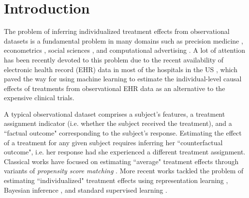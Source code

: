 \documentclass{article}
\begin{document}
\begin{abstract} 
We propose a novel approach for inferring the individualized causal effects of a treatment (intervention) from observational data. Our approach conceptualizes causal inference as a {\it multitask} learning problem; we model a subject's potential outcomes using a deep multitask network with a set of shared layers among the factual and counterfactual outcomes, and a set of outcome-specific layers. The impact of selection bias in the observational data is alleviated via a {\it propensity-dropout} regularization scheme, in which the network is thinned for every training example via a dropout probability that depends on the associated propensity score. The network is trained in alternating phases, where in each phase we use the training examples of one of the two potential outcomes (treated and control populations) to update the weights of the shared layers and the respective outcome-specific layers. Experiments conducted on data based on a real-world observational study show that our algorithm outperforms the state-of-the-art.       
\end{abstract} 

\section{Introduction} 
\label{intro}
The problem of inferring individualized treatment effects from observational datasets is a fundamental problem in many domains such as precision medicine \cite{shalit2016estimating}, econometrics \cite{abadie2016matching}, social sciences \cite{athey2016recursive}, and computational advertising \cite{bottou2013counterfactual}. A lot of attention has been recently devoted to this problem due to the recent availability of electronic health record (EHR) data in most of the hospitals in the US \cite{charles2015electronic}, which paved the way for using machine learning to estimate the individual-level causal effects of treatments from observational EHR data as an alternative to the expensive clinical trials. 

A typical observational dataset comprises a subject's features, a treatment assignment indicator (i.e. whether the subject received the treatment), and a ``factual outcome" corresponding to the subject's response. Estimating the effect of a treatment for any given subject requires inferring her ``counterfactual outcome", i.e. her response had she experienced a different treatment assignment. Classical works have focused on estimating ``average" treatment effects through variants of {\it propensity score matching} \cite{rubin2011causal, austin2011introduction, abadie2016matching, rosenbaum1983central, rubin1973matching}. More recent works tackled the problem of estimating ``individualized" treatment effects using representation learning \cite{johansson2016learning, shalit2016estimating}, Bayesian inference \cite{hill2012bayesian}, and standard supervised learning \cite{wager2015estimation}.    
\end{document}
